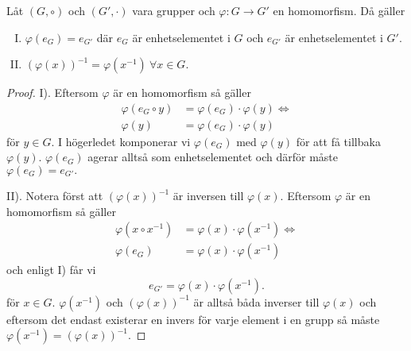 \documentclass{article}
\theoremstyle{definition}
\begin{document}
\begin{mytheo}{}{}
  Låt $(G, \circ)$ och $(G', \cdot)$ vara grupper och 
  $\varphi: G \rightarrow G'$ en homomorfism. Då gäller 
  \begin{enumerate}[I)]
    \item $\varphi(e_G) = e_{G'}$ där $e_G$ är enhetselementet i $G$ och $e_{G'}$ är
    enhetselementet i $G'$.
    \item $(\varphi(x))^{-1} = \varphi(x^{-1}) \ \forall x \in G.$
  \end{enumerate}
\end{mytheo}
\begin{proof}
  I). Eftersom $\varphi$ är en homomorfism så gäller 
  \begin{align*}
    \varphi (e_G \circ y) &= \varphi (e_G) \cdot \varphi (y) \iff \\
    \varphi (y) &= \varphi (e_G) \cdot \varphi (y)
  \end{align*}
  för $y \in G.$ I högerledet komponerar vi $\varphi (e_G)$ med $\varphi (y)$ för att få tillbaka 
  $\varphi (y)$. $\varphi (e_G)$ agerar alltså som enhetselementet och därför måste 
  $\varphi (e_G) = e_{G'}.$

  II). Notera först att $(\varphi(x))^{-1}$ är inversen till $\varphi(x)$. 
  Eftersom $\varphi$ är en homomorfism så gäller
  \begin{align*}
    \varphi (x \circ x^{-1}) &= \varphi (x) \cdot \varphi (x^{-1}) \iff \\
    \varphi (e_G) &= \varphi (x) \cdot \varphi (x^{-1})
  \end{align*}
  och enligt I) får vi
  \[e_{G'} =\varphi (x) \cdot \varphi (x^{-1}).\]
  för $x \in G.$
  $\varphi (x^{-1})$ och $(\varphi(x))^{-1}$ är alltså båda inverser till $\varphi (x)$
  och eftersom det endast existerar en invers för varje element i en grupp så måste 
  $\varphi (x^{-1}) = (\varphi(x))^{-1}.$
\end{proof}
\end{document}

